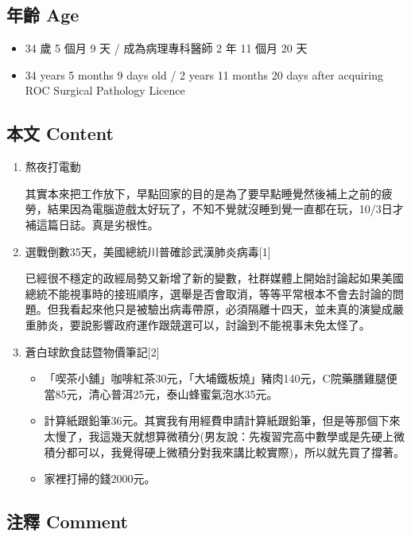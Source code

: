 \documentclass[
]{article}
\providecommand{\tightlist}{%
  \setlength{\itemsep}{0pt}\setlength{\parskip}{0pt}}
\begin{document}
\hypertarget{ux5e74ux9f61-age-29}{%
\subsection{年齡 Age}\label{ux5e74ux9f61-age-29}}

\begin{itemize}
\tightlist
\item
  34 歲 5 個月 9 天 / 成為病理專科醫師 2 年 11 個月 20 天
\item
  34 years 5 months 9 days old / 2 years 11 months 20 days after
  acquiring ROC Surgical Pathology Licence
\end{itemize}

\hypertarget{ux672cux6587-content-29}{%
\subsection{本文 Content}\label{ux672cux6587-content-29}}

\begin{enumerate}
\def\labelenumi{\arabic{enumi}.}
\item
  熬夜打電動

  其實本來把工作放下，早點回家的目的是為了要早點睡覺然後補上之前的疲勞，結果因為電腦遊戲太好玩了，不知不覺就沒睡到覺一直都在玩，10/3日才補這篇日誌。真是劣根性。
\item
  選戰倒數35天，美國總統川普確診武漢肺炎病毒{[}1{]}

  已經很不穩定的政經局勢又新增了新的變數，社群媒體上開始討論起如果美國總統不能視事時的接班順序，選舉是否會取消，等等平常根本不會去討論的問題。但我看起來他只是被驗出病毒帶原，必須隔離十四天，並未真的演變成嚴重肺炎，要說影響政府運作跟競選可以，討論到不能視事未免太怪了。
\item
  蒼白球飲食誌暨物價筆記{[}2{]}

  \begin{itemize}
  \tightlist
  \item
    「喫茶小舖」咖啡紅茶30元，「大埔鐵板燒」豬肉140元，C院藥膳雞腿便當85元，清心普洱25元，泰山蜂蜜氣泡水35元。
  \item
    計算紙跟鉛筆36元。其實我有用經費申請計算紙跟鉛筆，但是等那個下來太慢了，我這幾天就想算微積分(男友說：先複習完高中數學或是先硬上微積分都可以，我覺得硬上微積分對我來講比較實際)，所以就先買了撐著。
  \item
    家裡打掃的錢2000元。
  \end{itemize}
\end{enumerate}

\hypertarget{ux6ce8ux91cb-comment-29}{%
\subsection{注釋 Comment}\label{ux6ce8ux91cb-comment-29}}
\end{document}
